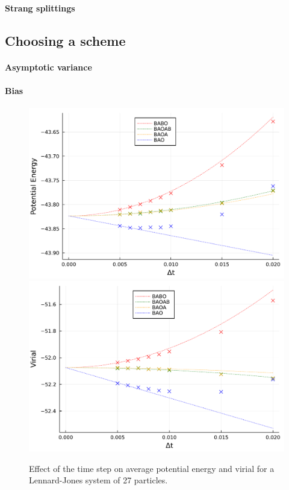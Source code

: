    \paragraph{Strang splittings}

    \begin{example}

    \end{example}


\subsection{Choosing a scheme}
\paragraph{Asymptotic variance}
\paragraph{Bias}
\begin{figure}[htbp]
    \begin{center}
      \includegraphics[width=0.49\linewidth]{figures/chapter1/potential_energy_bias.pdf}
      \includegraphics[width=0.49\linewidth]{figures/chapter1/virial_bias.pdf}
      \caption{ \label{fig:configurational_bias}
        Effect of the time step on average potential energy and virial for a Lennard-Jones system of 27 particles.
      }
    \end{center}
  \end{figure}

